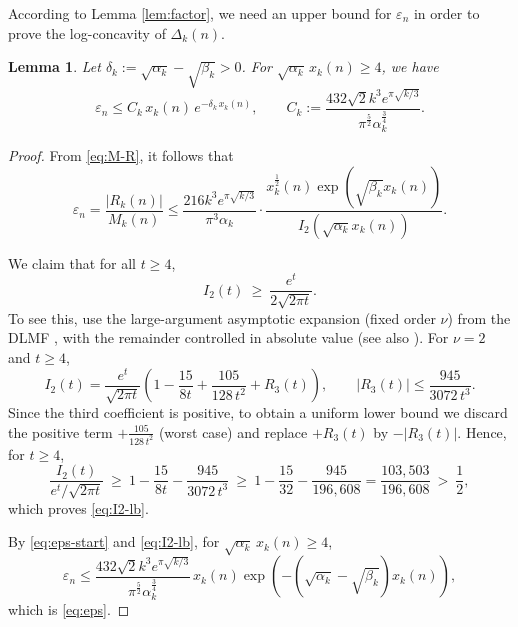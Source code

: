 \documentclass[12pt]{article}
\newtheorem{lem}[thm]{Lemma}
\numberwithin{equation}{section}
\begin{document}
According to Lemma \ref{lem:factor}, we need an upper bound for $\varepsilon_n$ in order to prove the log-concavity of $\Delta_k(n)$.

\begin{lem}\label{lem:relerr}
Let $\delta_k:=\sqrt{\alpha_k}-\sqrt{\beta_k}>0$. For $\sqrt{\alpha_k}\,x_k(n)\ge4$, we have
\begin{equation}\label{eq:eps}
\varepsilon_n \le C_k\,x_k(n)\,e^{-\delta_k\,x_k(n)},\qquad
C_k:=\frac{432\sqrt{2}k^3 e^{\pi\sqrt{k/3}}}{\pi^{\frac{5}{2}}\alpha_k^{\frac{3}{4}}}.
\end{equation}
\end{lem}

\begin{proof}
From \eqref{eq:M-R}, it follows that
\begin{equation}\label{eq:eps-start}
\varepsilon_n=\frac{|R_k(n)|}{M_k(n)}
 \le \frac{216k^3 e^{\pi\sqrt{k/3}}}{\pi^3\alpha_k}
 \cdot\frac{x_{k}^{\frac{1}{2}}(n)
\exp\left( \sqrt{\beta_k}x_{k}(n) \right)}{ I_2\left( \sqrt{\alpha_k}x_{k}(n) \right)}.
\end{equation}

We claim that for all $t\ge4$,
\begin{equation}\label{eq:I2-lb}
I_2(t)\ \ge\ \frac{e^{t}}{2\sqrt{2\pi t}}.
\end{equation}
To see this, use the large-argument asymptotic expansion (fixed order $\nu$) from the DLMF \cite[\S10.40(i)-(ii)]{Olver-Lozier-Boisvert-Clark-2010}, with the remainder controlled in absolute value (see also \cite{Nemes-2017}). For $\nu=2$ and $t\ge4$,
\[
I_2(t)=\frac{e^{t}}{\sqrt{2\pi t}}
\left(1-\frac{15}{8t}+\frac{105}{128\,t^{2}}+R_{3}(t)\right),
\qquad |R_{3}(t)|\le \frac{945}{3072\,t^{3}}.
\]
Since the third coefficient is positive, to obtain a uniform lower bound we discard the positive term $+\frac{105}{128\,t^2}$ (worst case) and replace $+R_3(t)$ by $-|R_3(t)|$. Hence, for $t\ge4$,
\[
\frac{I_2(t)}{e^{t}/\sqrt{2\pi t}}
\ \ge\ 1-\frac{15}{8t}-\frac{945}{3072\,t^{3}}
\ \ge\ 1-\frac{15}{32}-\frac{945}{196{,}608}
=\frac{103{,}503}{196{,}608}\ >\ \frac12,
\]
which proves \eqref{eq:I2-lb}.

By \eqref{eq:eps-start} and \eqref{eq:I2-lb}, for $\sqrt{\alpha_k}\,x_k(n)\ge4$,
\[
\varepsilon_n \le \frac{432\sqrt{2}k^3 e^{\pi\sqrt{k/3}}}{\pi^{\frac{5}{2}}\alpha_k^{\frac{3}{4}}}
\,x_k(n)\exp\left(-\left(\sqrt{\alpha_k}-\sqrt{\beta_k}\right)x_k(n)\right),
\]
which is \eqref{eq:eps}.
\end{proof}
\end{document}
